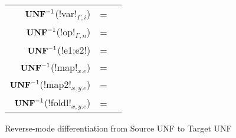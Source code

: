 \begin{figure*}[t]
    \begin{tabular}{r c l}
    $\mathbf{UNF}^{-1}$(!var!$_{\Gamma,i}$) &=&  \\
    $\mathbf{UNF}^{-1}$(!op!$_{\Gamma,n}$) &=&  \\ 
    $\mathbf{UNF}^{-1}$(!e1;e2!) &=& \\ 
    $\mathbf{UNF}^{-1}$(!map!$_{x.e}$) &=&  \\ 
    $\mathbf{UNF}^{-1}$(!map2!$_{x,y.e}$) &=&  \\ 
    $\mathbf{UNF}^{-1}$(!foldl!$_{x,y.e}$) &=&  \\  
    \end{tabular}
    \caption{Reverse-mode differentiation from Source UNF to Target UNF}
    \label{fig:diff_macro}
    \end{figure*}